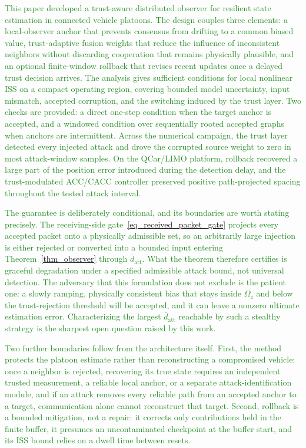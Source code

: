 \documentclass[letterpaper,journal]{IEEEtran}
\newcommand{\azrevcolor}{ForestGreen}
\newcommand{\azrev}[1]{\textcolor{\azrevcolor}{#1}}
\begin{document}
\azrev{This paper developed a trust-aware distributed observer for resilient state estimation in connected vehicle platoons. The design couples three elements: a local-observer anchor that prevents consensus from drifting to a common biased value, trust-adaptive fusion weights that reduce the influence of inconsistent neighbors without discarding cooperation that remains physically plausible, and an optional finite-window rollback that revises recent updates once a delayed trust decision arrives. The analysis gives sufficient conditions for local nonlinear ISS on a compact operating region, covering bounded model uncertainty, input mismatch, accepted corruption, and the switching induced by the trust layer. Two checks are provided: a direct one-step condition when the target anchor is accepted, and a windowed condition over sequentially rooted accepted graphs when anchors are intermittent. Across the numerical campaign, the trust layer detected every injected attack and drove the corrupted source weight to zero in most attack-window samples. On the QCar/LIMO platform, rollback recovered a large part of the position error introduced during the detection delay, and the trust-modulated ACC/CACC controller preserved positive path-projected spacing throughout the tested attack interval.}

\azrev{The guarantee is deliberately conditional, and its boundaries are worth stating precisely. The receiving-side gate~\eqref{eq_received_packet_gate} projects every accepted packet onto a physically admissible set, so an arbitrarily large injection is either rejected or converted into a bounded input entering Theorem~\ref{thm_observer} through $\bar d_{\mathrm{att}}$. What the theorem therefore certifies is graceful degradation under a specified admissible attack bound, not universal detection. The adversary that this formulation does not exclude is the patient one: a slowly ramping, physically consistent bias that stays inside $\Omega_z$ and below the trust-rejection threshold will be accepted, and it can leave a nonzero ultimate estimation error. Characterizing the largest $\bar d_{\mathrm{att}}$ reachable by such a stealthy strategy is the sharpest open question raised by this work.}

\azrev{Two further boundaries follow from the architecture itself. First, the method protects the platoon estimate rather than reconstructing a compromised vehicle: once a neighbor is rejected, recovering its true state requires an independent trusted measurement, a reliable local anchor, or a separate attack-identification module, and if an attack removes every reliable path from an accepted anchor to a target, communication alone cannot reconstruct that target. Second, rollback is a bounded mitigation, not a repair: it corrects only contributions held in the finite buffer, it presumes an uncontaminated checkpoint at the buffer start, and its ISS bound relies on a dwell time between resets.}
\end{document}
